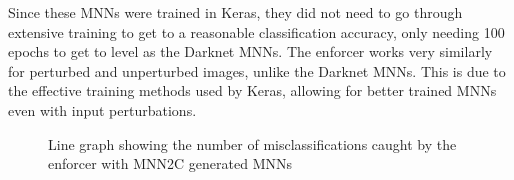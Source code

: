 Since these \acp{MNN} were trained in Keras, they did not need to go through extensive training to get to a reasonable classification accuracy, only needing 100 epochs to get to level as the Darknet \acp{MNN}.
The enforcer works very similarly for perturbed and unperturbed images, unlike the Darknet \acp{MNN}.
This is due to the effective training methods used by Keras, allowing for better trained \acp{MNN} even with input perturbations.


\begin{figure}[h]
	\centering
	\scalebox{0.9}{}
	\caption{Line graph showing the number of misclassifications caught by the enforcer with \ac{MNN2C} generated \acp{MNN} \label{fig:sign-graphboth-mnn2c}}
\end{figure}





















